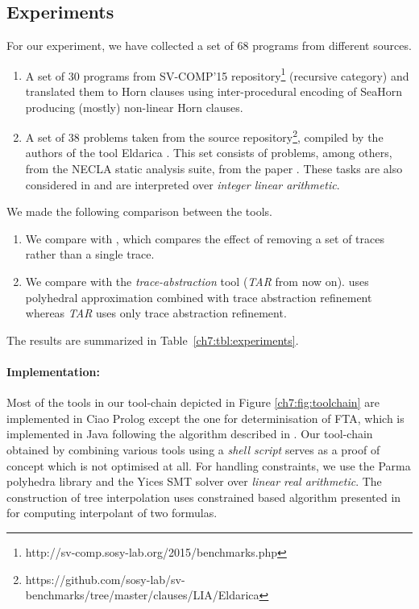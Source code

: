 \subsection{Experiments}
\label{ch7:experiments}

 For our experiment, we have collected a set of 68 programs from different sources.
\begin{enumerate}
\item A set of 30 programs from SV-COMP'15 repository\footnote{http://sv-comp.sosy-lab.org/2015/benchmarks.php} \cite{DBLP:conf/tacas/000115} (recursive category)  and translated them to Horn clauses using inter-procedural encoding of SeaHorn \cite{DBLP:conf/tacas/GurfinkelKN15,DBLP:conf/cav/GurfinkelKKN15} producing  (mostly) non-linear Horn clauses. 

\item A set of 38 problems taken from the source repository\footnote{https://github.com/sosy-lab/sv-benchmarks/tree/master/clauses/LIA/Eldarica}, compiled by the authors of the tool Eldarica \cite{DBLP:conf/fm/HojjatKGIKR12}. This set consists of problems, among others, from  the NECLA static analysis suite, from the paper \cite{DBLP:conf/tacas/JhalaM06}. These tasks  are also considered in \cite{WangJ2015} and  are interpreted over  \emph{integer linear arithmetic}.
\end{enumerate}

We made the following comparison between the tools.

\begin{enumerate}
\item We compare   with  , which compares the effect of removing a set of traces rather than a single trace.  

\item We compare  with the \emph{trace-abstraction} tool \cite{WangJ2015} (\emph{TAR} from now on).     uses polyhedral approximation combined with trace abstraction refinement  whereas  \emph{TAR} uses only trace abstraction refinement.
\end{enumerate}





The results are summarized in Table~\ref{ch7:tbl:experiments}. 

\paragraph{Implementation:}
Most of the tools in our tool-chain depicted in Figure \ref{ch7:fig:toolchain} are implemented in Ciao Prolog \cite{DBLP:journals/tplp/HermenegildoBCLMMP12} except the one for  determinisation of FTA, which is implemented in Java following the algorithm described in  \cite{DBLP:journals/corr/GallagherAK15}. Our tool-chain obtained by combining  various tools using a \emph{shell script} serves as a proof of concept which is not optimised at all. For handling constraints, we  use the Parma polyhedra library \cite{DBLP:journals/scp/BagnaraHZ08} and the Yices SMT solver \cite{Dutertre:cav2014} over \emph{linear real arithmetic}. The construction of tree interpolation uses constrained based algorithm presented in \cite{DBLP:journals/jsc/RybalchenkoS10} for computing interpolant of two formulas. 

